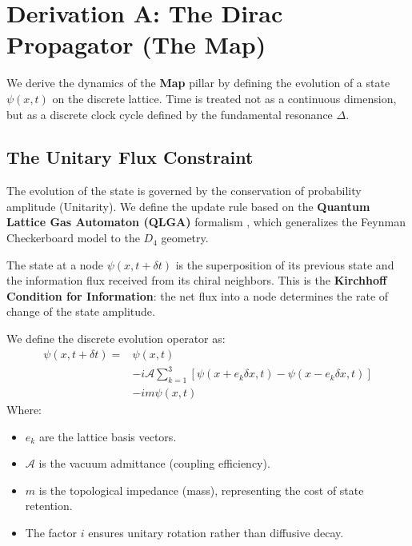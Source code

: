 \section{Derivation A: The Dirac Propagator (The Map)}
\label{sec:dirac_derivation}

We derive the dynamics of the \textbf{Map} pillar by defining the evolution of a state $\psi(x,t)$ on the discrete lattice. Time is treated not as a continuous dimension, but as a discrete clock cycle defined by the fundamental resonance $\Delta$.

\subsection{The Unitary Flux Constraint}
The evolution of the state is governed by the conservation of probability amplitude (Unitarity). We define the update rule based on the \textbf{Quantum Lattice Gas Automaton (QLGA)} formalism \cite{meyer_quantum_1996}, which generalizes the Feynman Checkerboard model \cite{feynman_quantum_1965} to the $D_4$ geometry.

The state at a node $\psi(x, t+\delta t)$ is the superposition of its previous state and the information flux received from its chiral neighbors. This is the \textbf{Kirchhoff Condition for Information}: the net flux into a node determines the rate of change of the state amplitude.

We define the discrete evolution operator as:
\begin{equation}
\begin{split}
    \psi(x, t+\delta t) =& \psi(x, t) \\
    & - i \mathcal{A} \sum_{k=1}^{3} \left[ \psi(x + e_k \delta x, t) - \psi(x - e_k \delta x, t) \right] \\
    & - i m \psi(x, t)
\end{split}
\label{eq:LatticeUpdateRule}
\end{equation}
Where:
\begin{itemize}
    \item $e_k$ are the lattice basis vectors.
    \item $\mathcal{A}$ is the vacuum admittance (coupling efficiency).
    \item $m$ is the topological impedance (mass), representing the cost of state retention.
    \item The factor $i$ ensures unitary rotation rather than diffusive decay.
\end{itemize}


